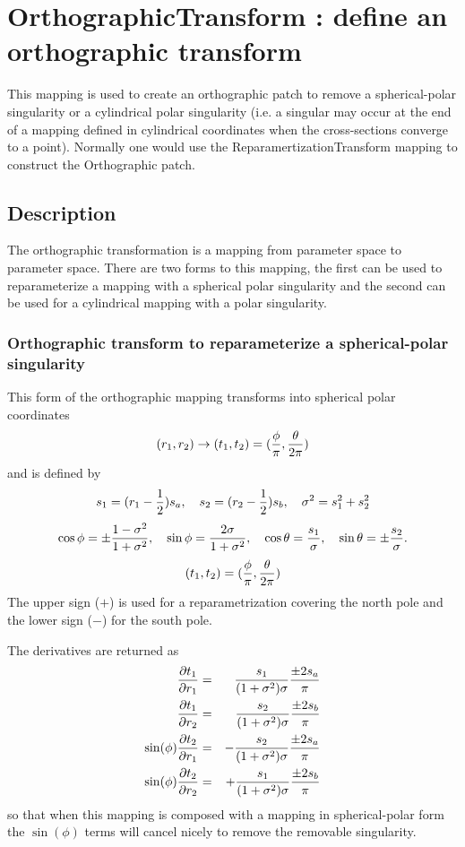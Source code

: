 \section{OrthographicTransform : define an orthographic transform}

This mapping is used to create an orthographic patch to remove
a spherical-polar singularity or a cylindrical polar singularity (i.e.
a singular may occur at the end of a mapping defined in cylindrical
coordinates when the cross-sections converge to a point).
Normally one would use the {\ff ReparamertizationTransform}
mapping to construct the Orthographic patch.

\subsection{Description}

The orthographic transformation is a mapping from parameter
space to parameter space. There are two forms to this mapping, the first
can be used to reparameterize a mapping with a spherical polar singularity
and the second can be used for a cylindrical mapping with a polar singularity.

\def\half {{1\over2}}
\subsubsection{Orthographic transform to reparameterize a spherical-polar singularity}

\def\ss {\sigma}
This form of the  orthographic mapping transforms into spherical polar coordinates
\[
      (r_1,r_2) \rightarrow (t_1,t_2) = ({\phi\over\pi},{\theta\over 2\pi})
\]
and is defined by
\[
      s_1 = (r_1-{1\over2}) s_a, \quad s_2 = ( r_2 - {1\over2} ) s_b, 
    \quad \ss^2=s_1^2 + s_2^2
\]
\[
 \cos\phi=\pm{1-\ss^2\over1+\ss^2},\quad
 \sin\phi={2\ss\over 1+\ss^2},\quad
 \cos\theta={s_1\over\ss},\quad
 \sin\theta=\pm{s_2\over\ss}.
\]
\[
   (t_1,t_2) = ({\phi\over\pi},{\theta\over 2\pi})
\]
The upper sign ($+$) is used for a reparametrization  covering the north
pole and the lower sign ($-$) for the south pole.  

The derivatives are returned as
\begin{eqnarray}
{\partial t_1 \over \partial r_1 } &=& {s_1 \over (1+\ss^2) \ss } {\pm 2 s_a \over \pi}  \\
{\partial t_1 \over \partial r_2 } &=& {s_2 \over (1+\ss^2) \ss } {\pm 2 s_b \over \pi}  \\
\sin(\phi){\partial t_2 \over \partial r_1 } &=& -{s_2 \over (1+\ss^2) \ss} {\pm 2 s_a \over \pi}  \\
\sin(\phi){\partial t_2 \over \partial r_2 } &=& +{s_1 \over (1+\ss^2) \ss} {\pm 2 s_b \over \pi}  
\end{eqnarray}
so that when this mapping is composed with a mapping in spherical-polar form the
$\sin(\phi)$ terms will cancel nicely to remove the removable singularity.


